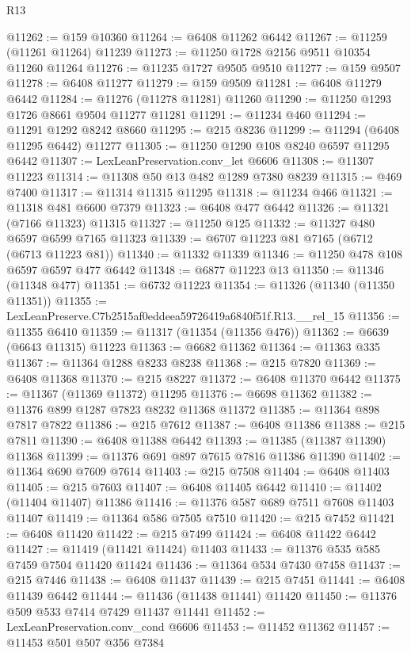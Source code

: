 \begin{lexlean}{R13}
\begin{coremodule}
@11262 := @159 @10360
@11264 := @6408 @11262 @6442
@11267 := @11259 (@11261 @11264) @11239
@11273 := @11250 @1728 @2156 @9511 @10354 @11260 @11264
@11276 := @11235 @1727 @9505 @9510
@11277 := @159 @9507
@11278 := @6408 @11277
@11279 := @159 @9509
@11281 := @6408 @11279 @6442
@11284 := @11276 (@11278 @11281) @11260
@11290 := @11250 @1293 @1726 @8661 @9504 @11277 @11281
@11291 := @11234 @460
@11294 := @11291 @1292 @8242 @8660
@11295 := @215 @8236
@11299 := @11294 (@6408 @11295 @6442) @11277
@11305 := @11250 @1290 @108 @8240 @6597 @11295 @6442
@11307 := LexLeanPreservation.conv_let @6606
@11308 := @11307 @11223
@11314 := @11308 @50 @13 @482 @1289 @7380 @8239
@11315 := @469 @7400
@11317 := @11314 @11315 @11295
@11318 := @11234 @466
@11321 := @11318 @481 @6600 @7379
@11323 := @6408 @477 @6442
@11326 := @11321 (@7166 @11323) @11315
@11327 := @11250 @125
@11332 := @11327 @480 @6597 @6599 @7165 @11323
@11339 := @6707 @11223 @81 @7165 (@6712 (@6713 @11223 @81))
@11340 := @11332 @11339
@11346 := @11250 @478 @108 @6597 @6597 @477 @6442
@11348 := @6877 @11223 @13
@11350 := @11346 (@11348 @477)
@11351 := @6732 @11223
@11354 := @11326 (@11340 (@11350 @11351))
@11355 := LexLeanPreserve.C7b2515af0eddeea59726419a6840f51f.R13.__rel_15
@11356 := @11355 @6410
@11359 := @11317 (@11354 (@11356 @476))
@11362 := @6639 (@6643 @11315) @11223
@11363 := @6682 @11362
@11364 := @11363 @335
@11367 := @11364 @1288 @8233 @8238
@11368 := @215 @7820
@11369 := @6408 @11368
@11370 := @215 @8227
@11372 := @6408 @11370 @6442
@11375 := @11367 (@11369 @11372) @11295
@11376 := @6698 @11362
@11382 := @11376 @899 @1287 @7823 @8232 @11368 @11372
@11385 := @11364 @898 @7817 @7822
@11386 := @215 @7612
@11387 := @6408 @11386
@11388 := @215 @7811
@11390 := @6408 @11388 @6442
@11393 := @11385 (@11387 @11390) @11368
@11399 := @11376 @691 @897 @7615 @7816 @11386 @11390
@11402 := @11364 @690 @7609 @7614
@11403 := @215 @7508
@11404 := @6408 @11403
@11405 := @215 @7603
@11407 := @6408 @11405 @6442
@11410 := @11402 (@11404 @11407) @11386
@11416 := @11376 @587 @689 @7511 @7608 @11403 @11407
@11419 := @11364 @586 @7505 @7510
@11420 := @215 @7452
@11421 := @6408 @11420
@11422 := @215 @7499
@11424 := @6408 @11422 @6442
@11427 := @11419 (@11421 @11424) @11403
@11433 := @11376 @535 @585 @7459 @7504 @11420 @11424
@11436 := @11364 @534 @7430 @7458
@11437 := @215 @7446
@11438 := @6408 @11437
@11439 := @215 @7451
@11441 := @6408 @11439 @6442
@11444 := @11436 (@11438 @11441) @11420
@11450 := @11376 @509 @533 @7414 @7429 @11437 @11441
@11452 := LexLeanPreservation.conv_cond @6606
@11453 := @11452 @11362
@11457 := @11453 @501 @507 @356 @7384

\end{coremodule}
\end{lexlean}
